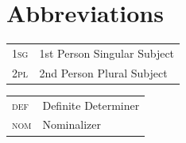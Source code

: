 \documentclass[output=paper,newtxmath,modfonts,nonflat,hidelinks]{langsci/langscibook}
\begin{document}



\section*{Abbreviations}
\begin{tabularx}{.45\textwidth}{ll}
1\textsc{sg} & 1st Person Singular Subject \\
2\textsc{pl} & 2nd Person Plural Subject\\
\end{tabularx}
\begin{tabularx}{.45\textwidth}{ll}
\textsc{def} & Definite Determiner\\
\textsc{nom} & Nominalizer \\
\end{tabularx}

\sloppy
\printbibliography[heading=subbibliography,notkeyword=this]
\end{document}
